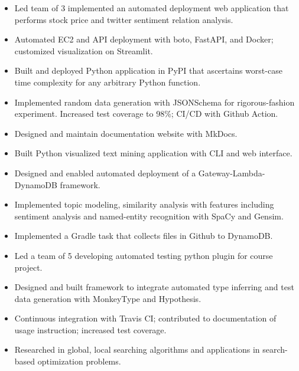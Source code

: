 \begin{itemize}
\item Led team of 3 implemented an automated deployment web application that performs stock price and twitter sentiment relation analysis.
\item Automated EC2 and API deployment with boto, FastAPI, and Docker; customized visualization on Streamlit.
\end{itemize}
\smallskip
{}
\begin{itemize}
\item Built and deployed Python application in PyPI that ascertains worst-case time complexity for any arbitrary Python function.
\item Implemented random data generation with JSONSchema for rigorous-fashion experiment. Increased test coverage to 98\%; CI/CD with Github Action.
\item Designed and maintain documentation website with MkDocs.
\end{itemize}
\smallskip
{}
\begin{itemize}
\item Built Python visualized text mining application with CLI and web interface.
\item Designed and enabled automated deployment of a Gateway-Lambda-DynamoDB framework.
\item Implemented topic modeling, similarity analysis with features including sentiment analysis and named-entity recognition with SpaCy and Gensim.
\item Implemented a Gradle task that collects files in Github to DynamoDB.
\end{itemize}
\smallskip
{}
\begin{itemize}
\item Led a team of 5 developing automated testing python plugin for course project.
\item Designed and built framework to integrate automated type inferring and test data generation with MonkeyType and Hypothesis.
\end{itemize}
\smallskip
{}
\begin{itemize}
\item Continuous integration with Travis CI; contributed to documentation of usage instruction; increased test coverage.
\item Researched in global, local searching algorithms and applications in search-based optimization problems.
\end{itemize}

